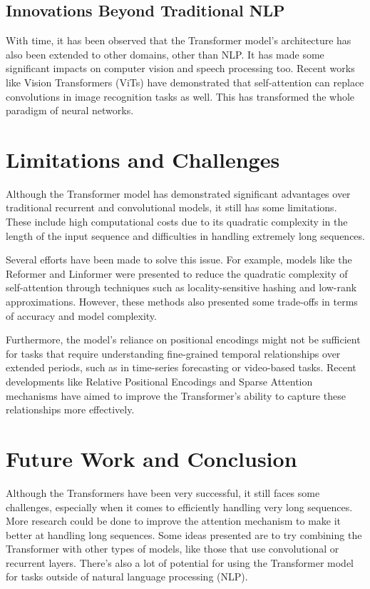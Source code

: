 \documentclass[runningheads]{llncs}
\begin{document}
\subsection{Innovations Beyond Traditional NLP}
With time, it has been observed that the Transformer model's architecture has also been extended to other domains, other than NLP. It has made some significant impacts on computer vision and speech processing too. Recent works like Vision Transformers (ViTs) \cite{dosovitskiy2020image} have demonstrated that self-attention can replace convolutions in image recognition tasks as well. This has transformed the whole paradigm of neural networks.

\section{Limitations and Challenges}
Although the Transformer model has demonstrated significant advantages over traditional recurrent and convolutional models, it still has some limitations. These include high computational costs due to its quadratic complexity in the length of the input sequence and difficulties in handling extremely long sequences.

Several efforts have been made to solve this issue. For example, models like the Reformer \cite{kitaev2020reformer} and Linformer \cite{wang2020linformer} were presented to reduce the quadratic complexity of self-attention through techniques such as locality-sensitive hashing and low-rank approximations. However, these methods also presented some trade-offs in terms of accuracy and model complexity.

Furthermore, the model's reliance on positional encodings might not be sufficient for tasks that require understanding fine-grained temporal relationships over extended periods, such as in time-series forecasting or video-based tasks. Recent developments like Relative Positional Encodings \cite{shaw2018self} and Sparse Attention mechanisms have aimed to improve the Transformer's ability to capture these relationships more effectively.

\section{Future Work and Conclusion}
Although the Transformers have been very successful, it still faces some challenges, especially when it comes to efficiently handling very long sequences. More research could be done to improve the attention mechanism to make it better at handling long sequences. Some ideas presented are to try combining the Transformer with other types of models, like those that use convolutional or recurrent layers. There's also a lot of potential for using the Transformer model for tasks outside of natural language processing (NLP).
\end{document}
